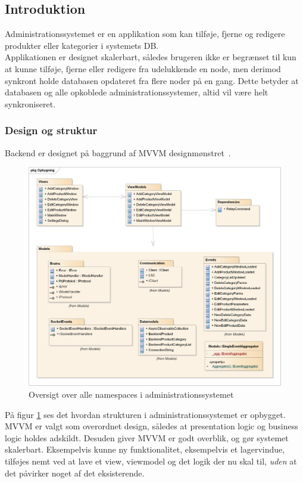 \subsection{Introduktion}


Administrationssystemet er en applikation som kan tilføje, fjerne og redigere produkter eller kategorier i  systemets \gls{DB}.\\
Applikationen er designet skalerbart, således brugeren ikke er begrænset til kun at kunne tilføje, fjerne eller redigere fra udelukkende en node, men derimod synkront holde databasen opdateret fra flere noder på en gang. Dette betyder at databasen og alle opkoblede administrationssystemer, altid vil være helt synkroniseret.

\subsubsection*{Design og struktur}
Backend er designet på baggrund af MVVM designmønstret~\cite{MVVM}. 
\begin{figure}[!h]
    \centering
    \includegraphics[width=1\textwidth]{Systemdesign/backend/Images/Opbygning.png}
    \caption{Oversigt over alle namespaces i administrationssystemet}
    \label{fig:oversigtAs}
\end{figure}

På figur \ref{fig:oversigtAs} ses det hvordan strukturen i administrationssystemet er opbygget. MVVM er valgt som overordnet design, således at presentation logic og business logic holdes adskildt. Desuden giver MVVM er godt overblik, og gør systemet skalerbart. Eksempelvis kunne ny funktionalitet, eksempelvis et lagervindue, tilføjes nemt ved at lave et view, viewmodel og det logik der nu skal til, \textit{uden} at det påvirker noget af det eksisterende.\\\\

